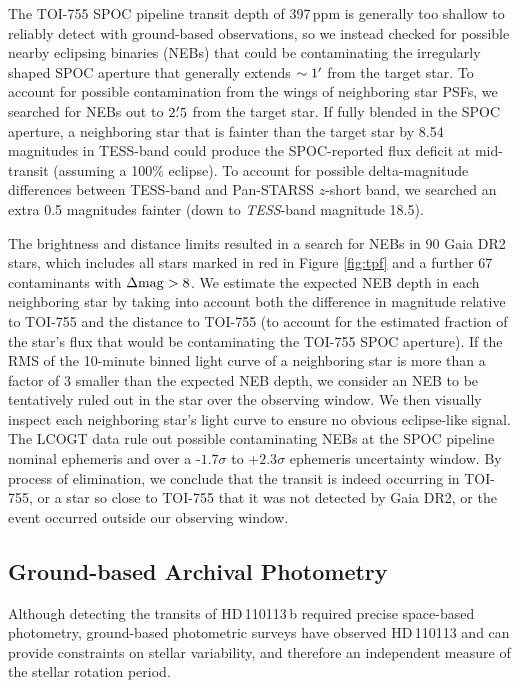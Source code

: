 \documentclass[fleqn,usenatbib]{mnras}
\newcommand{\Tstar}{HD\,110113}
\newcommand{\Tplanet}{HD\,110113\,b}
\begin{document}
The TOI-755 SPOC pipeline transit depth of 397\,ppm is generally too shallow to reliably detect with ground-based observations, so we instead checked for possible nearby eclipsing binaries (NEBs) that could be contaminating the irregularly shaped SPOC aperture that generally extends $\sim1\hbox{$^\prime$}$ from the target star.
To account for possible contamination from the wings of neighboring star PSFs, we searched for NEBs out to $2\hbox{$.\mkern-4mu^\prime$}5$ from the target star.
If fully blended in the SPOC aperture, a neighboring star that is fainter than the target star by 8.54 magnitudes in TESS-band could produce the SPOC-reported flux deficit at mid-transit (assuming a 100\% eclipse).
To account for possible delta-magnitude differences between TESS-band and Pan-STARSS $z$-short band, we searched an extra 0.5 magnitudes fainter (down to \textit{TESS}-band magnitude 18.5). 

The brightness and distance limits resulted in a search for NEBs in 90 Gaia DR2 stars, which includes all stars marked in red in Figure \ref{fig:tpf} and a further 67 contaminants with $\Delta{\rm mag}>8$.
We estimate the expected NEB depth in each neighboring star by taking into account both the difference in magnitude relative to TOI-755 and the distance to TOI-755 (to account for the estimated fraction of the star's flux that would be contaminating the TOI-755 SPOC aperture).
If the RMS of the 10-minute binned light curve of a neighboring star is more than a factor of 3 smaller than the expected NEB depth, we consider an NEB to be tentatively ruled out in the star over the observing window.
We then visually inspect each neighboring star's light curve to ensure no obvious eclipse-like signal.
The LCOGT data rule out possible contaminating NEBs at the SPOC pipeline nominal ephemeris and over a -$1.7\sigma$ to +$2.3\sigma$ ephemeris uncertainty window.
By process of elimination, we conclude that the transit is indeed occurring in TOI-755, or a star so close to TOI-755 that it was not detected by Gaia DR2, or the event occurred outside our observing window.

\subsection{Ground-based Archival Photometry}
Although detecting the transits of \Tplanet{} required precise space-based photometry, ground-based photometric surveys have observed \Tstar{} and can provide constraints on stellar variability, and therefore an independent measure of the stellar rotation period.
\end{document}
